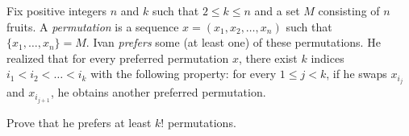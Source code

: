 Fix positive integers \(n\) and \(k\) such that \(2 \le k \le n\) and a set \(M\) consisting of \(n\) fruits. A \emph{permutation} is a sequence \(x = (x_1, x_2, \ldots, x_n)\) such that \(\{x_1, \ldots, x_n\} = M\). Ivan \emph{prefers} some (at least one) of these permutations. He realized that for every preferred permutation \(x\), there exist \(k\) indices \(i_1 < i_2 < \ldots < i_k\) with the following property: for every \(1 \le j < k\), if he swaps \(x_{i_j}\) and \(x_{i_{j+1}}\), he obtains another preferred permutation.

Prove that he prefers at least \(k!\) permutations.
